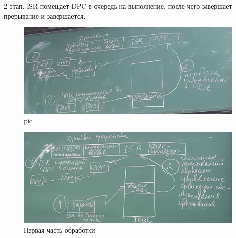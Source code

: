 2 этап. ISR помещает DPC в очередь на выполнение, после чего завершает прерывание и завершается.

\begin{figure}[H]
    \centering
    \includegraphics[width=\textwidth]{pic/7.png}
    \caption{pic}
\end{figure}

\begin{figure}[H]
    \centering
    \includegraphics[width=\textwidth]{pic/8.png}
    \caption{Первая часть обработки}
\end{figure}

